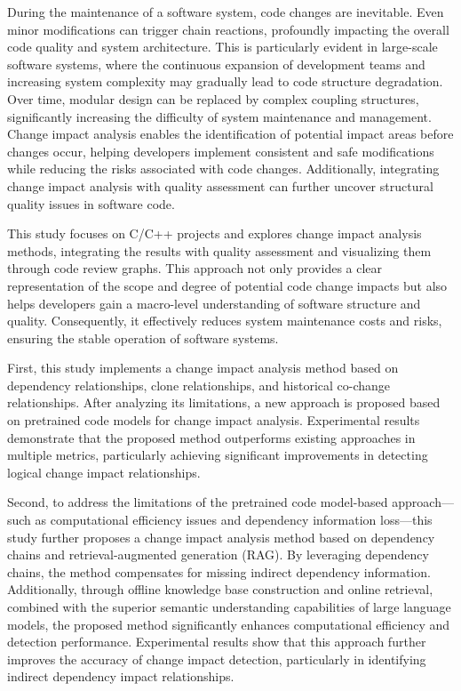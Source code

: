 \begin{eabstract}
  During the maintenance of a software system, code changes are inevitable. Even minor modifications can trigger chain reactions, profoundly impacting the overall code quality and system architecture. This is particularly evident in large-scale software systems, where the continuous expansion of development teams and increasing system complexity may gradually lead to code structure degradation. Over time, modular design can be replaced by complex coupling structures, significantly increasing the difficulty of system maintenance and management. Change impact analysis enables the identification of potential impact areas before changes occur, helping developers implement consistent and safe modifications while reducing the risks associated with code changes. Additionally, integrating change impact analysis with quality assessment can further uncover structural quality issues in software code.

This study focuses on C/C++ projects and explores change impact analysis methods, integrating the results with quality assessment and visualizing them through code review graphs. This approach not only provides a clear representation of the scope and degree of potential code change impacts but also helps developers gain a macro-level understanding of software structure and quality. Consequently, it effectively reduces system maintenance costs and risks, ensuring the stable operation of software systems.

First, this study implements a change impact analysis method based on dependency relationships, clone relationships, and historical co-change relationships. After analyzing its limitations, a new approach is proposed based on pretrained code models for change impact analysis. Experimental results demonstrate that the proposed method outperforms existing approaches in multiple metrics, particularly achieving significant improvements in detecting logical change impact relationships.

Second, to address the limitations of the pretrained code model-based approach—such as computational efficiency issues and dependency information loss—this study further proposes a change impact analysis method based on dependency chains and retrieval-augmented generation (RAG). By leveraging dependency chains, the method compensates for missing indirect dependency information. Additionally, through offline knowledge base construction and online retrieval, combined with the superior semantic understanding capabilities of large language models, the proposed method significantly enhances computational efficiency and detection performance. Experimental results show that this approach further improves the accuracy of change impact detection, particularly in identifying indirect dependency impact relationships.


\end{eabstract}
